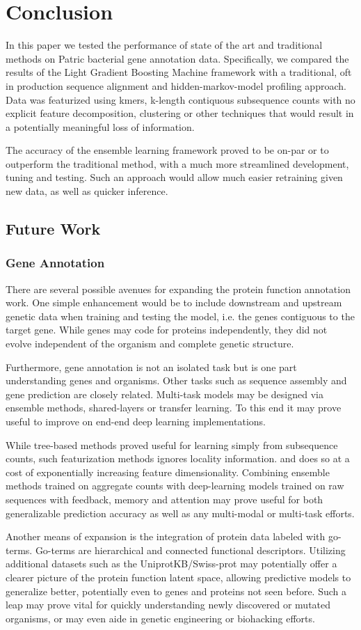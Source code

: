 \section{Conclusion}
In this paper we tested the performance of state of the art and traditional methods on Patric bacterial gene annotation data. Specifically, we compared the results of the Light Gradient Boosting Machine framework with a traditional, oft in production sequence alignment and hidden-markov-model profiling approach. Data was featurized using kmers, k-length contiquous subsequence counts with no explicit feature decomposition, clustering or other techniques that would result in a potentially meaningful loss of information.

The accuracy of the ensemble learning framework proved to be on-par or to outperform the traditional method, with a much more streamlined development, tuning and testing. Such an approach would allow much easier retraining given new data, as well as quicker inference.

\subsection{Future Work}
\subsubsection{Gene Annotation}
There are several possible avenues for expanding the protein function annotation work. One simple enhancement would be to include downstream and upstream genetic data when training and testing the model, i.e. the genes contiguous to the target gene. While genes may code for proteins independently, they did not evolve independent of the organism and complete genetic structure.

Furthermore, gene annotation is not an isolated task but is one part understanding genes and organisms. Other tasks such as sequence assembly and gene prediction are closely related. Multi-task models may be designed via ensemble methods, shared-layers or transfer learning. To this end it may prove useful to improve on end-end deep learning implementations. 

While tree-based methods proved useful for learning simply from subsequence counts, such featurization methods ignores locality information. and does so at a cost of exponentially increasing feature dimensionality. Combining ensemble methods trained on aggregate counts with deep-learning models trained on raw sequences with feedback, memory and attention may prove useful for both generalizable prediction accuracy as well as any multi-modal or multi-task efforts.

Another means of expansion is the integration of protein data labeled with go-terms. Go-terms are hierarchical and connected functional descriptors. Utilizing additional datasets such as the UniprotKB/Swiss-prot may potentially offer a clearer picture of the protein function latent space, allowing predictive models to generalize better, potentially even to genes and proteins not seen before. Such a leap may prove vital for quickly understanding newly discovered or mutated organisms, or may even aide in genetic engineering or biohacking efforts.